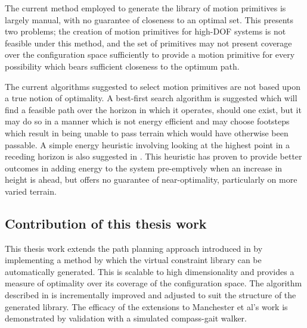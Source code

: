 The current method employed to generate the library of motion primitives is largely manual, with no guarantee of closeness to an optimal set. This presents two problems; the creation of motion primitives for high-DOF systems is not feasible under this method, and the set of primitives may not present coverage over the configuration space sufficiently to provide a motion primitive for every possibility which bears sufficient closeness to the optimum path. 

The current algorithms suggested to select motion primitives are not based upon a true notion of optimality. A best-first search algorithm is suggested which will find a feasible path over the horizon in which it operates, should one exist, but it may do so in a manner which is not energy efficient and may choose footsteps which result in being unable to pass terrain which would have otherwise been passable. A simple energy heuristic involving looking at the highest point in a receding horizon is also suggested in \cite{manchester13planning}. This heuristic has proven to provide better outcomes in adding energy to the system pre-emptively when an increase in height is ahead, but offers no guarantee of near-optimality, particularly on more varied terrain. 

\subsection{Contribution of this thesis work}
This thesis work extends the path planning approach introduced in \cite{manchester13planning} by implementing a method by which the virtual constraint library can be automatically generated. This is scalable to high dimensionality and provides a measure of optimality over its coverage of the configuration space. The algorithm described in \cite{manchester13planning} is incrementally improved and adjusted to suit the structure of the generated library. The efficacy of the extensions to Manchester et al's work is demonstrated by validation with a simulated compass-gait walker.